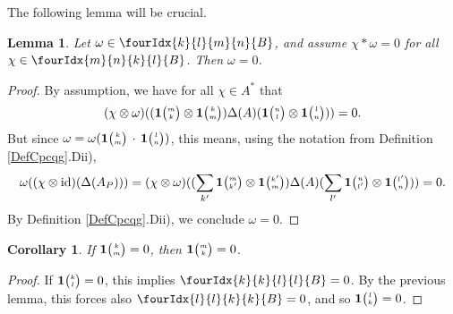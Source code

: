 \documentclass[11pt]{article}
\DeclareMathOperator{\id}{id}
\newcommand{\Grt}[3]{#1{\tiny {\begin{pmatrix} #2\\#3\end{pmatrix}}}}
\newcommand{\UnitC}[2]{\Grt{\mathbf{1}}{#1}{#2}}
\newcommand{\Gr}[5]{\fourIdx{#2}{#4}{#3}{#5}{#1}}%
\newtheorem{Lem}[Theorem]{Lemma}
\newtheorem{Cor}[Theorem]{Corollary}
\theoremstyle{definition}
\numberwithin{equation}{section}
\begin{document}
The following lemma will be crucial.

\begin{Lem}\label{LemRefSep} Let $\omega \in \Gr{B}{k}{m}{l}{n}$, and assume $\chi*\omega =  0$ for all $\chi \in \Gr{B}{m}{k}{n}{l}$. Then $\omega =0$.
\end{Lem} 
\begin{proof} By assumption, we have for all $\chi\in A^*$ that \[(\chi\otimes \omega)((\UnitC{m}{k}\otimes \UnitC{k}{m})\Delta(A)(\UnitC{n}{l}\otimes \UnitC{l}{n}))=0.\] But since $\omega = \omega(\UnitC{k}{m}\,\cdot\,\UnitC{l}{n})$, this means, using the notation from Definition \ref{DefCpcqg}.Dii), \[\omega((\chi\otimes \id)(\Delta(A_P))) =(\chi\otimes \omega)((\sum_{k'}\UnitC{m}{k'}\otimes \UnitC{k'}{m})\Delta(A)(\sum_{l'}\UnitC{n}{l'}\otimes \UnitC{l'}{n})) =0.\] By Definition \ref{DefCpcqg}.Dii), we conclude $\omega=0$.
\end{proof} 

\begin{Cor} If $\UnitC{k}{m}=0$, then $\UnitC{m}{k}=0$. 
\end{Cor}
\begin{proof} If $\UnitC{k}{l}=0$, this implies $\Gr{B}{k}{l}{k}{l}=0$. By the previous lemma, this forces also $\Gr{B}{l}{k}{l}{k}=0$, and so $\UnitC{l}{k}=0$. 
\end{proof} 
\end{document}
